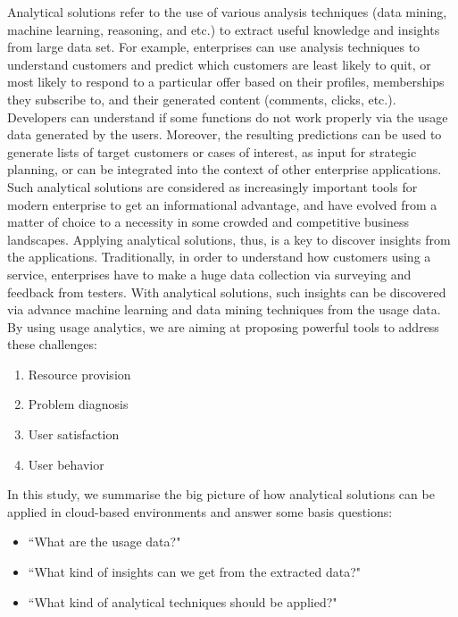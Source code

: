 Analytical solutions refer to the use of various analysis techniques (data mining, machine learning, reasoning, and etc.) to extract useful knowledge and insights from large data set. For example, enterprises can use analysis techniques to understand customers and predict which customers are least likely to quit, or most likely to respond to a particular offer based on their profiles, memberships they subscribe to, and their generated content (comments, clicks, etc.). Developers can understand if some functions do not work properly via the usage data generated by the users. Moreover, the resulting predictions can be used to generate lists of target customers or cases of interest, as input for strategic planning, or can be integrated into the context of other enterprise applications. Such analytical solutions are considered as increasingly important tools for modern enterprise to get an informational advantage, and have evolved from a matter of choice to a necessity in some crowded and competitive business landscapes. Applying analytical solutions, thus, is a key to discover insights from the applications. Traditionally, in order to understand how customers using a service, enterprises have to make a huge data collection via surveying and feedback from testers. With analytical solutions, such insights can be discovered via advance machine learning and data mining techniques from the usage data. By using usage analytics, we are aiming at proposing powerful tools to address these challenges: 

\begin{enumerate}
\item Resource provision
\item Problem diagnosis
\item User satisfaction
\item User behavior
	
\end{enumerate}

In this study, we summarise the big picture of how analytical solutions can be applied in cloud-based environments and answer some basis questions: 
\begin{itemize}
	\item ``What are the usage data?"
	\item ``What kind of insights can we get from the extracted data?"
	\item ``What kind of analytical techniques should be applied?"
\end{itemize}